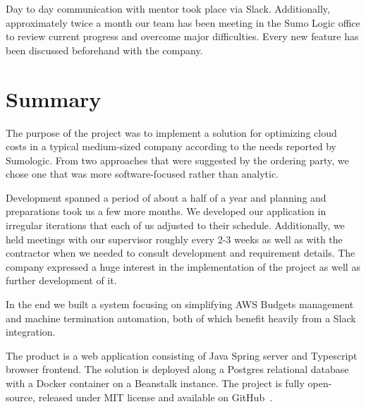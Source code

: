 \documentclass[licencjacka,en]{thesisclass}
\begin{document}
    Day to day communication with mentor took place via Slack.
    Additionally, approximately twice a month our team has been meeting
    in the Sumo Logic office to review current progress and overcome major difficulties.
    Every new feature has been discussed beforehand with the company.

    \chapter{Summary}
    The purpose of the project was to implement a solution for optimizing cloud costs
    in a typical medium-sized company according to the needs reported by Sumologic.
    From two approaches that were suggested by the ordering party,
    we chose one that was more software-focused rather than analytic.

    Development spanned a period of about a half of a year and planning and preparations took us
    a few more months.
    We developed our application in irregular iterations that each of us adjusted
    to their schedule.
    Additionally, we held meetings with our supervisor roughly every 2-3 weeks
    as well as with the contractor when we needed to consult development and requirement details.
    The company expressed a huge interest in the implementation of the project
    as well as further development of it.

    In the end we built a system focusing on simplifying AWS Budgets management
    and machine termination automation,
    both of which benefit heavily from a Slack integration.

    The product is a web application consisting of Java Spring server
    and Typescript browser frontend.
    The solution is deployed along a Postgres relational database with a Docker container
    on a Beanstalk instance.
    The project is fully open-source, released under MIT license
    and available on GitHub~\cite{Omigost}.
\end{document}
